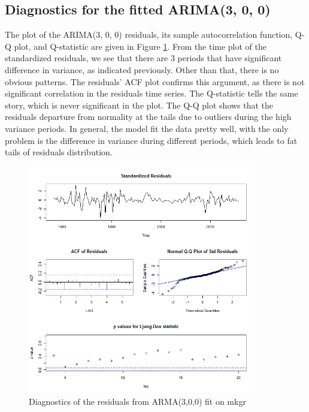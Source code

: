 \subsection{Diagnostics for the fitted ARIMA(3, 0, 0) }
The plot of the ARIMA(3, 0, 0) residuals, its sample autocorrelation function, Q-Q plot, and Q-statistic are given in Figure \ref{fig:residual}. From the time plot of the standardized residuals, we see that there are 3 periods that have significant difference in variance, as indicated previously. Other than that, there is no obvious patterns. The residuals' ACF plot confirms this argument, as there is not significant correlation in the residuals time series. The Q-statistic tells the same story, which is never significant in the plot. The Q-Q plot shows that the residuals departure from normality at the tails due to outliers during the high variance periods. In general, the model fit the data pretty well, with the only problem is the difference in variance during different periods, which leads to fat tails of residuals distribution.

\begin{figure}
	\centering
	\includegraphics[width=10cm]{Figures/Problem1_residual}
	\caption{Diagnostics of the residuals from ARMA(3,0,0) fit on mkgr}
	\label{fig:residual}
\end{figure}

